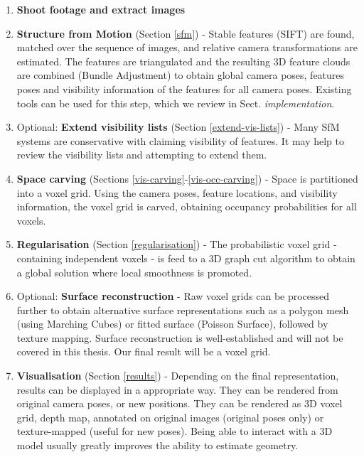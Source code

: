 \begin{enumerate}
  \item \textbf{Shoot footage and extract images}
  \item \textbf{Structure from Motion} (Section \ref{sfm}) - Stable features (\ie SIFT) are found, matched over the sequence of images, and relative camera transformations are estimated. The features are triangulated and the resulting 3D feature clouds are combined (\ie Bundle Adjustment) to obtain global camera poses, features poses and visibility information of the features for all camera poses. Existing tools can be used for this step, which we review in Sect. \emph{implementation}.
  \item Optional: \textbf{Extend visibility lists} (Section \ref{extend-vis-lists}) - Many SfM systems are conservative with claiming visibility of features. It may help to review the visibility lists and attempting to extend them.
  \item \textbf{Space carving} (Sections \ref{vis-carving}-\ref{vis-occ-carving}) - Space is partitioned into a voxel grid. Using the camera poses, feature locations, and visibility information, the voxel grid is carved, obtaining occupancy probabilities for all voxels.
  \item \textbf{Regularisation} (Section \ref{regularisation}) - The probabilistic voxel grid - containing independent voxels - is feed to a 3D graph cut algorithm to obtain a global solution where local smoothness is promoted.
  \item Optional: \textbf{Surface reconstruction} - Raw voxel grids can be processed further to obtain alternative surface representations such as a polygon mesh (\ie using Marching Cubes) or fitted surface (\ie Poisson Surface), followed by texture mapping. Surface reconstruction is well-established and will not be covered in this thesis. Our final result will be a voxel grid. %
  \item \textbf{Visualisation} (Section \ref{results}) - Depending on the final representation, results can be displayed in a appropriate way. They can be rendered from original camera poses, or new positions. They can be rendered as 3D voxel grid, depth map, annotated on original images (original poses only) or texture-mapped (useful for new poses). Being able to interact with a 3D model usually greatly improves the ability to estimate geometry.
\end{enumerate}


